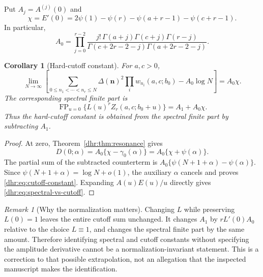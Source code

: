\documentclass[11pt,letterpaper]{article}
\numberwithin{equation}{section}
\newtheorem{corollary}[theorem]{Corollary}
\theoremstyle{definition}\newtheorem{definition}[theorem]{Definition}
\theoremstyle{remark}\newtheorem{remark}[theorem]{Remark}
\DeclareMathOperator{\FP}{FP}
\begin{document}
Put $A_j=A^{(j)}(0)$ and
\begin{equation}\label{dhr:eq:chi}
 \chi=E'(0)=2\psi(1)-\psi(r)-\psi(a+r-1)-\psi(c+r-1).
\end{equation}
In particular,
\begin{equation}\label{dhr:eq:residue}
 A_0=\prod_{j=0}^{r-2}
 \frac{j!\,\Gamma(a+j)\Gamma(c+j)\Gamma(r-j)}
 {\Gamma(c+2r-2-j)\Gamma(a+2r-2-j)}.
\end{equation}

\begin{corollary}[Hard-cutoff constant]\label{dhr:cor:cutoff}
For $a,c>0$,
\begin{equation}\label{dhr:eq:cutoff-constant}
 \boxed{\lim_{N\to\infty}\left[
 \sum_{0\leq n_1<\cdots<n_r\leq N}
   \Delta(\bm n)^2\prod_i w_{n_i}(a,c;b_0)
       -A_0\log N\right]=A_0\chi.}
\end{equation}
The corresponding spectral finite part is
\begin{equation}\label{dhr:eq:spectral-vs-cutoff}
 \FP_{u=0}\{L(u)^rZ_r(a,c;b_0+u)\}=A_1+A_0\chi.
\end{equation}
Thus the hard-cutoff constant is obtained from the spectral finite
part by subtracting $A_1$.
\end{corollary}
\begin{proof}
At zero, Theorem~\ref{dhr:thm:resonance} gives
\[
 D(0;\alpha)=A_0\{\chi-\gamma_0(\alpha)\}
            =A_0\{\chi+\psi(\alpha)\}.
\]
The partial sum of the subtracted counterterm is
$A_0\{\psi(N+1+\alpha)-\psi(\alpha)\}$.
Since $\psi(N+1+\alpha)=\log N+o(1)$, the auxiliary $\alpha$
cancels and proves \eqref{dhr:eq:cutoff-constant}.
Expanding $A(u)E(u)/u$ directly gives
\eqref{dhr:eq:spectral-vs-cutoff}.
\end{proof}

\begin{remark}[Why the normalization matters]
Changing $L$ while preserving $L(0)=1$ leaves the entire cutoff sum
unchanged. It changes $A_1$ by $rL'(0)A_0$ relative to the choice
$L\equiv1$, and changes the spectral finite part by the same amount.
Therefore identifying spectral and cutoff constants without specifying
the amplitude derivative cannot be a normalization-invariant statement.
This is a correction to that possible extrapolation, not an allegation
that the inspected manuscript makes the identification.
\end{remark}


\end{document}
